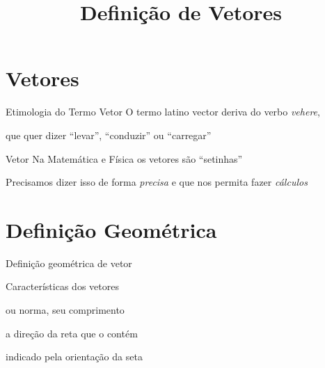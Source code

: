 \documentclass[fleqn,aspectratio=169,12pt]{beamer}
\title{Definição de Vetores}
\begin{document}
\addtitle

\section{Vetores}


\begin{frame}{Etimologia do Termo Vetor}
  O termo latino vector deriva do verbo \textit{vehere},

  \pause
  que quer dizer ``levar'', ``conduzir'' ou ``carregar''
\end{frame}

\begin{frame}{Vetor}
  Na Matemática e Física os vetores são ``setinhas''

  \pause
  \bigskip
  Precisamos dizer isso de forma \emph{precisa}
  \pause
  e que nos permita fazer \emph{cálculos}
\end{frame}


\section{Definição Geométrica}

\begin{frame}{Definição geométrica de vetor}



\end{frame}

\begin{frame}{Características dos vetores}
  \begin{description}[<+->]
      \item[módulo]  ou norma, seu comprimento
      \item[direção] a direção da reta que o contém
      \item[sentido] indicado pela orientação da seta
  \end{description}
\end{frame}
\end{document}
